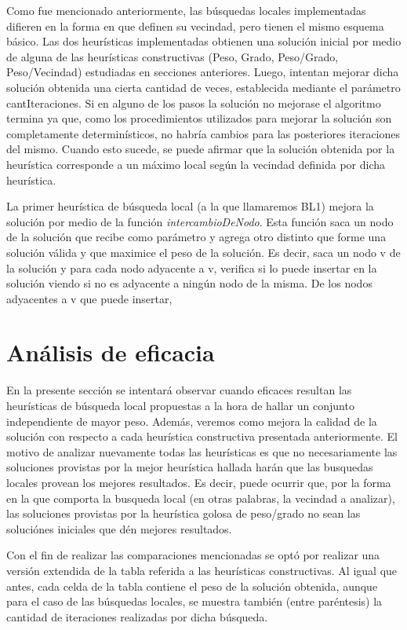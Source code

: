 \documentclass[a4paper,11pt] {article}
\begin{document}
Como fue mencionado anteriormente, las b\'usquedas locales implementadas difieren en la forma en que definen su vecindad, pero tienen el mismo esquema b\'asico. Las dos heur\'isticas implementadas obtienen una soluci\'on inicial por medio de alguna de las heur\'isticas constructivas (Peso, Grado, Peso/Grado, Peso/Vecindad) estudiadas en secciones anteriores. Luego, intentan mejorar dicha soluci\'on obtenida una cierta cantidad de veces, establecida mediante el par\'ametro cantIteraciones. Si en alguno de los pasos la soluci\'on no mejorase el algoritmo termina ya que, como los procedimientos utilizados para mejorar la soluci\'on son completamente determin\'isticos, no habr\'ia cambios para las posteriores iteraciones del mismo. Cuando esto sucede, se puede afirmar que la soluci\'on obtenida por la heur\'istica corresponde a un m\'aximo local seg\'un la vecindad definida por dicha heur\'istica.

La primer heur\'istica de b\'usqueda local (a la que llamaremos BL1) mejora la soluci\'on por medio de la funci\'on \textit{intercambioDeNodo}. Esta funci\'on saca un nodo de la soluci\'on que recibe como par\'ametro y agrega otro distinto que forme una soluci\'on v\'alida y que maximice el peso de la soluci\'on. Es decir, saca un nodo v de la soluci\'on y para cada nodo adyacente a v, verifica si lo puede insertar en la soluci\'on viendo si no es adyacente a ning\'un nodo de la misma. De los nodos adyacentes a v que puede insertar, 
\section*{An\'alisis de eficacia}

En la presente sección se intentará observar cuando eficaces resultan las heurísticas de búsqueda local propuestas a la hora de hallar un conjunto independiente de mayor peso. Además, veremos como mejora la calidad de la solución con respecto a cada heurística constructiva presentada anteriormente. El motivo de analizar nuevamente todas las heurísticas es que no necesariamente las soluciones provistas por la mejor heurística hallada harán que las busquedas locales provean los mejores resultados. Es decir, puede ocurrir que, por la forma en la que comporta la busqueda local (en otras palabras, la vecindad a analizar), las soluciones provistas por la heurística golosa de peso/grado no sean las soluciónes iniciales que dén mejores resultados.

Con el fin de realizar las comparaciones mencionadas se optó por realizar una versión extendida de la tabla referida a las heurísticas constructivas. Al igual que antes, cada celda de la tabla contiene el peso de la solución obtenida, aunque para el caso de las búsquedas locales, se muestra también (entre paréntesis) la cantidad de iteraciones realizadas por dicha búsqueda.
\end{document}
